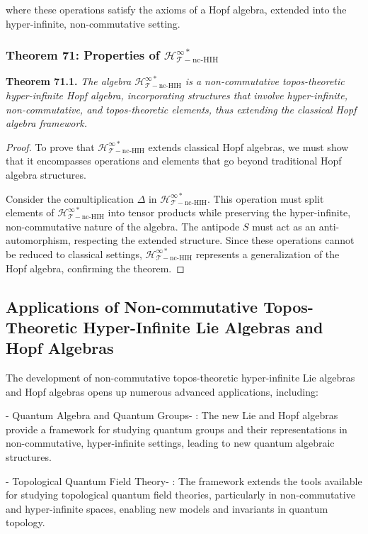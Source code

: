\documentclass{article}
\begin{document}
where these operations satisfy the axioms of a Hopf algebra, extended into the hyper-infinite, non-commutative setting.

\subsubsection{Theorem 71: Properties of \(\mathcal{H}_{\mathcal{T}-\text{nc-HIH}}^{\infty *}\)}
\textbf{Theorem 71.1.} \textit{The algebra \(\mathcal{H}_{\mathcal{T}-\text{nc-HIH}}^{\infty *}\) is a non-commutative topos-theoretic hyper-infinite Hopf algebra, incorporating structures that involve hyper-infinite, non-commutative, and topos-theoretic elements, thus extending the classical Hopf algebra framework.}

\begin{proof}
To prove that \(\mathcal{H}_{\mathcal{T}-\text{nc-HIH}}^{\infty *}\) extends classical Hopf algebras, we must show that it encompasses operations and elements that go beyond traditional Hopf algebra structures.

Consider the comultiplication \(\Delta\) in \(\mathcal{H}_{\mathcal{T}-\text{nc-HIH}}^{\infty *}\). This operation must split elements of \(\mathcal{H}_{\mathcal{T}-\text{nc-HIH}}^{\infty *}\) into tensor products while preserving the hyper-infinite, non-commutative nature of the algebra. The antipode \(S\) must act as an anti-automorphism, respecting the extended structure. Since these operations cannot be reduced to classical settings, \(\mathcal{H}_{\mathcal{T}-\text{nc-HIH}}^{\infty *}\) represents a generalization of the Hopf algebra, confirming the theorem.
\end{proof}

\subsection{Applications of Non-commutative Topos-Theoretic Hyper-Infinite Lie Algebras and Hopf Algebras}
The development of non-commutative topos-theoretic hyper-infinite Lie algebras and Hopf algebras opens up numerous advanced applications, including:

-  Quantum Algebra and Quantum Groups- : The new Lie and Hopf algebras provide a framework for studying quantum groups and their representations in non-commutative, hyper-infinite settings, leading to new quantum algebraic structures.

-  Topological Quantum Field Theory- : The framework extends the tools available for studying topological quantum field theories, particularly in non-commutative and hyper-infinite spaces, enabling new models and invariants in quantum topology.
\end{document}
